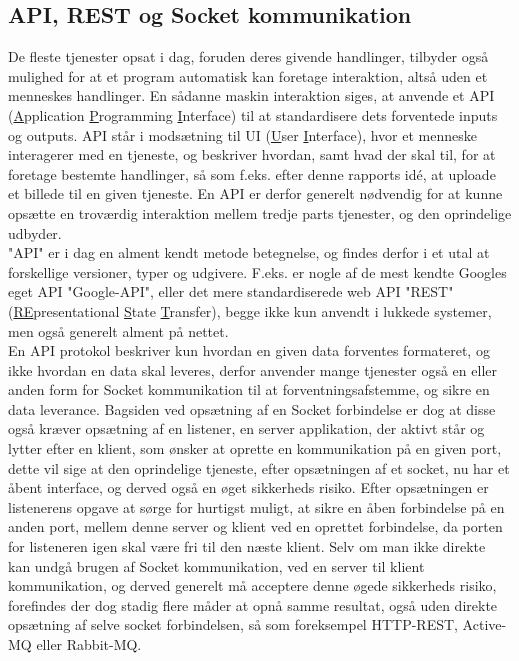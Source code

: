 \subsection{API, REST og Socket kommunikation}
\label{API}
De fleste tjenester opsat i dag, foruden deres givende handlinger, tilbyder også mulighed for at et program automatisk kan foretage interaktion, altså uden et menneskes handlinger. En sådanne maskin interaktion siges, at anvende et API (\underline{A}pplication \underline{P}rogramming \underline{I}nterface) til at standardisere dets forventede inputs og outputs. 
API står i modsætning til UI (\underline{U}ser \underline{I}nterface), hvor et menneske interagerer med en tjeneste, og beskriver hvordan, samt hvad der skal til, for at foretage bestemte handlinger, så som f.eks. efter denne rapports idé, at uploade et billede til en given tjeneste. En API er derfor generelt nødvendig for at kunne opsætte en troværdig interaktion mellem tredje parts tjenester, og den oprindelige udbyder.\cite{WhatIsAPI}\\
"API" er i dag en alment kendt metode betegnelse, og findes derfor i et utal at forskellige versioner, typer og udgivere. F.eks. er nogle af de mest kendte Googles eget API "Google-API", eller det mere standardiserede web API "REST" (\underline{RE}presentational \underline{S}tate \underline{T}ransfer), begge ikke kun anvendt i lukkede systemer, men også generelt alment på nettet.\cite{codecademy_REST}\\
En API protokol beskriver kun hvordan en given data forventes formateret, og ikke hvordan en data skal leveres, derfor anvender mange tjenester også en eller anden form for Socket kommunikation til at forventningsafstemme, og sikre en data leverance. Bagsiden ved opsætning af en Socket forbindelse er dog at disse også kræver opsætning af en listener, en server applikation, der aktivt står og lytter efter en klient, som ønsker at oprette en kommunikation på en given port, dette vil sige at den oprindelige tjeneste, efter opsætningen af et socket, nu har et åbent interface, og derved også en øget sikkerheds risiko. Efter opsætningen er listenerens opgave at sørge for hurtigst muligt, at sikre en åben forbindelse på en anden port, mellem denne server og klient ved en oprettet forbindelse, da porten for listeneren igen skal være fri til den næste klient. \cite{WhatIsSocket} Selv om man ikke direkte kan undgå brugen af Socket kommunikation, ved en server til klient kommunikation, og derved generelt må acceptere denne øgede sikkerheds risiko, forefindes der dog stadig flere måder at opnå samme resultat, også uden direkte opsætning af selve socket forbindelsen, så som foreksempel HTTP-REST, Active-MQ eller Rabbit-MQ.\cite{SocketAlternatives}

